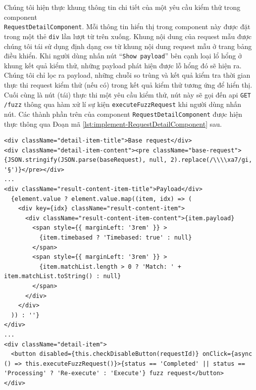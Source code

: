 Chúng tôi hiện thực khung thông tin chi tiết của một yêu cầu kiểm thử trong component\\\texttt{RequestDetailComponent}. Mỗi thông tin hiển thị trong component này được đặt trong một thẻ \texttt{div} lần lượt từ trên xuống. Khung nội dung của request mẫu được chúng tôi tái sử dụng định dạng \acrshort{css} từ khung nội dung request mẫu ở trang bảng điều khiển. Khi người dùng nhấn nút ``\texttt{Show payload}'' bên cạnh loại lổ hổng ở khung kết quả kiểm thử, những payload phát hiện được lỗ hổng đó sẽ hiện ra. Chúng tôi chỉ lọc ra payload, những chuỗi so trùng và kết quả kiểm tra thời gian thực thi request kiểm thử (nếu có) trong kết quả kiểm thử tương ứng để hiển thị. Cuối cùng là nút (tái) thực thi một yêu cầu kiểm thử, nút này sẽ gọi đến \acrshort{api} \colorbox{gray!30}{\texttt{GET /fuzz}} thông qua hàm xử lí sự kiện \texttt{executeFuzzRequest} khi người dùng nhấn nút. Các thành phần trên của component \texttt{RequestDetailComponent} được hiện thực thông qua Đoạn mã \ref{lst:implement-RequestDetailComponent} sau.
\begin{lstlisting}[style=ES6, label={lst:implement-RequestDetailComponent}, caption={Hiện thực một số thành phần của component RequestDetailComponent}]
<div className="detail-item-title">Base request</div>
<div className="detail-item-content"><pre className="base-request">{JSON.stringify(JSON.parse(baseRequest), null, 2).replace(/\\\\xa7/gi, '§')}</pre></div>
...
<div className="result-content-item-title">Payload</div>
  {element.value ? element.value.map((item, idx) => (
    <div key={idx} className="result-content-item">
      <div className="result-content-item-content">{item.payload}
        <span style={{ marginLeft: '3rem' }} >
          {item.timebased ? 'Timebased: true' : null}
        </span>
        <span style={{ marginLeft: '3rem' }} >
          {item.matchList.length > 0 ? 'Match: ' + item.matchList.toString() : null}
        </span>
      </div>
    </div>
  )) : ''}
</div>
...
<div className="detail-item">
  <button disabled={this.checkDisableButton(requestId)} onClick={async () => this.executeFuzzRequest()}>{status == 'Completed' || status == 'Processing' ? 'Re-execute' : 'Execute'} fuzz request</button>
</div>
\end{lstlisting}
